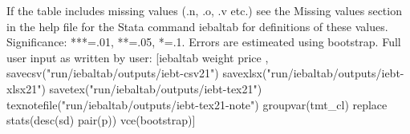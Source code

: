 If the table includes missing values (.n, .o, .v etc.) see the Missing values section in the help file for the Stata command iebaltab for definitions of these values. Significance: ***=.01, **=.05, *=.1. Errors are estimeated using bootstrap. Full user input as written by user: [iebaltab weight price , savecsv("run/iebaltab/outputs/iebt-csv21") savexlsx("run/iebaltab/outputs/iebt-xlsx21") savetex("run/iebaltab/outputs/iebt-tex21") texnotefile("run/iebaltab/outputs/iebt-tex21-note") groupvar(tmt\_cl) replace stats(desc(sd) pair(p)) vce(bootstrap)] 
